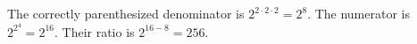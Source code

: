 The correctly parenthesized denominator is $2^{2\cdot2\cdot2}=2^8$. The numerator is $2^{2^4}=2^{16}$. Their ratio is $2^{16-8}=\boxed{256}$.

